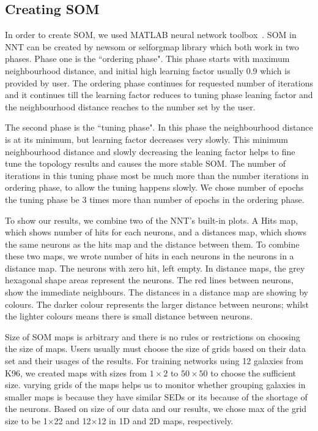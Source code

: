 \subsection{Creating SOM}
\label{sec: create_som}
     In order to create SOM, we used {\tiny MATLAB} neural network toolbox~\citep[NNT,][]{matlabtolbox}.
     SOM in {\tiny NNT} can be created by {\tiny newsom} or {\tiny selforgmap} library which both work in two phases. 
     Phase one is the ``ordering phase". 
     This phase starts with maximum neighbourhood distance, and initial high learning factor usually 0.9 which is provided by user. 
     The ordering phase continues for requested number of iterations and it continues till the learning factor reduces to tuning phase leaning factor and the neighbourhood distance reaches to the number set by the user.
     
     The second phase is the ``tuning phase".
     In this phase the neighbourhood distance is at its minimum, but learning factor decreases very slowly.
     This minimum neighbourhood distance and slowly decreasing the leaning factor helps to fine tune the topology results and causes the more stable SOM. 
     The number of iterations in this tuning phase most be much more than the number iterations in ordering phase, to allow the tuning happens slowly. 
     We chose number of epochs the tuning phase be 3 times more than number of epochs in the ordering phase.
     
     To show our results, we combine two of the {\tiny NNT}'s built-in plots. 
     A Hits map, which shows number of hits for each neurons, and a distances map, which shows the same neurons as the hits map and the distance between them. 
     To combine these two maps, we wrote number of hits in each neurons in the neurons in a distance map.
     The neurons with zero hit, left empty.
     In distance maps, the grey hexagonal shape areas represent the neurons.
     The red lines between neurons, show the immediate neighbours.
     The distances in a distance map are showing by colours.
     The darker colour represents the larger distance between neurons; whilst the lighter colours means there is small distance between neurons.
      
    
     Size of SOM maps is arbitrary and there is no rules or restrictions on choosing the size of maps. 
     Users usually must choose the size of grids based on their data set and their usages of the results.
     For training networks using 12 galaxies from K96, we created maps with sizes from $1\times2$ to $50\times50$ to choose the sufficient size.
     varying grids of the maps helps us to monitor whether grouping galaxies in smaller maps is because they have similar SEDs or its because of the shortage of the neurons.
     Based on size of our data and our results, we chose max of the grid size to be 1$\times$22 and 12$\times$12 in 1D and 2D maps, respectively. 
     
